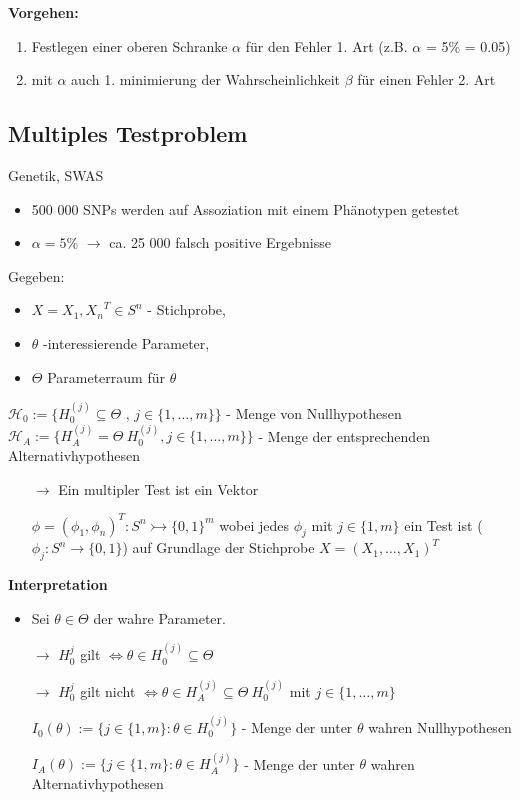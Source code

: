 \textbf{Vorgehen:}
\begin{enumerate}
	\item Festlegen einer oberen Schranke $\alpha$ für den Fehler 1. Art (z.B. $\alpha$ = 5\% = 0.05)
	\item mit $\alpha$ auch 1. minimierung der Wahrscheinlichkeit $\beta$ für einen Fehler 2. Art
\end{enumerate}

\subsection{Multiples Testproblem}
\begin{exmp}
	Genetik, SWAS
	\begin{itemize}
		\item 500 000 SNPs werden auf Assoziation mit einem Phänotypen getestet
		\item $\alpha = 5\%$ $\rightarrow$ ca. 25 000 falsch positive Ergebnisse
	\end{itemize}
\end{exmp}
\newpage
Gegeben:
\begin{itemize}
	\item $X= {X_1, X_n}^T \in S^n$ - Stichprobe,
	\item $\theta$ -interessierende Parameter,
	\item $\Theta$ Parameterraum für $\theta$
\end{itemize}
$\mathcal{H}_0 := \{ H_0^{(j)} \subseteq \Theta$ , $j \in \{1, \ldots, m\} \}$ - Menge von Nullhypothesen\\
$\mathcal{H}_A := \{ H_A^(j) = \Theta \ H_0^{(j)} , j \in \{1, \ldots, m\}\}$ - Menge der entsprechenden Alternativhypothesen
\begin{itemize}
	\item[$\rightarrow$] Ein multipler Test ist ein Vektor 
	\item[]$\phi = (\phi_1, \phi_n)^T: S^n \rightarrowtail \{0,1\}^m$ 
wobei jedes $\phi_j$ mit $j \in \{1,m\}$ ein Test ist ($\phi_j: S^n \rightarrow \{0,1\}$) auf Grundlage der Stichprobe $X = (X_1,\ldots, X_1)^T$
\end{itemize}
\textbf{Interpretation}
\begin{itemize}
	\item Sei $\theta \in \Theta$ der wahre Parameter.
	\item[$\rightarrow$] $H_0^{j}$  gilt $\Leftrightarrow \theta \in H_0^{(j)} \subseteq \Theta$
	\item[$\rightarrow$] $H_0^{j}$ gilt nicht $\Leftrightarrow \theta \in H_A^{(j)} \subseteq \Theta \ H_0^{(j)} $
mit $j \in \{1,\ldots,m\}$
	\item[]$I_0(\theta) := \{j \in \{1,m\} : \theta \in H_0^{(j)} \}$ - Menge der unter $\theta$ wahren Nullhypothesen
	\item[]$I_A(\theta) := \{j \in \{1,m\} : \theta \in H_A^{(j)} \}$ - Menge der unter $\theta$ wahren Alternativhypothesen
\end{itemize}

